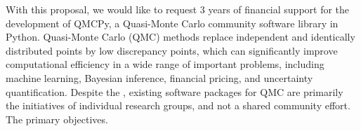\documentclass[11pt]{article}%
\begin{document}

\noindent With this proposal, we would like to request 3 years of financial support for the development of QMCPy, a Quasi-Monte Carlo community software library in Python. Quasi-Monte Carlo (QMC) methods replace independent and identically distributed points by low discrepancy points, which can significantly improve computational efficiency in a wide range of important problems, including machine learning, Bayesian inference, financial pricing, and uncertainty quantification. Despite the , existing software packages for QMC are primarily the initiatives of individual research groups, and not a shared community effort. The primary objectives.



\end{document}
